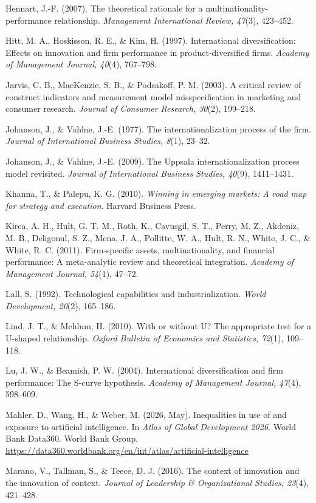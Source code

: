 \documentclass[12pt,a4paper]{article}
\begin{document}
Hennart, J.-F. (2007). The theoretical rationale for a
multinationality-performance relationship. \emph{Management
International Review, 47}(3), 423--452.

Hitt, M. A., Hoskisson, R. E., \& Kim, H. (1997). International
diversification: Effects on innovation and firm performance in
product-diversified firms. \emph{Academy of Management Journal, 40}(4),
767--798.

Jarvis, C. B., MacKenzie, S. B., \& Podsakoff, P. M. (2003). A critical
review of construct indicators and measurement model misspecification in
marketing and consumer research. \emph{Journal of Consumer Research,
30}(2), 199--218.

Johanson, J., \& Vahlne, J.-E. (1977). The internationalization process
of the firm. \emph{Journal of International Business Studies, 8}(1),
23--32.

Johanson, J., \& Vahlne, J.-E. (2009). The Uppsala internationalization
process model revisited. \emph{Journal of International Business
Studies, 40}(9), 1411--1431.

Khanna, T., \& Palepu, K. G. (2010). \emph{Winning in emerging markets:
A road map for strategy and execution}. Harvard Business Press.

Kirca, A. H., Hult, G. T. M., Roth, K., Cavusgil, S. T., Perry, M. Z.,
Akdeniz, M. B., Deligonul, S. Z., Mena, J. A., Pollitte, W. A., Hult, R.
N., White, J. C., \& White, R. C. (2011). Firm-specific assets,
multinationality, and financial performance: A meta-analytic review and
theoretical integration. \emph{Academy of Management Journal, 54}(1),
47--72.

Lall, S. (1992). Technological capabilities and industrialization.
\emph{World Development, 20}(2), 165--186.

Lind, J. T., \& Mehlum, H. (2010). With or without U? The appropriate
test for a U-shaped relationship. \emph{Oxford Bulletin of Economics and
Statistics, 72}(1), 109--118.

Lu, J. W., \& Beamish, P. W. (2004). International diversification and
firm performance: The S-curve hypothesis. \emph{Academy of Management
Journal, 47}(4), 598--609.

Mahler, D., Wang, H., \& Weber, M. (2026, May). Inequalities in use of
and exposure to artificial intelligence. In \emph{Atlas of Global
Development 2026}. World Bank Data360. World Bank Group.
\url{https://data360.worldbank.org/en/int/atlas/artificial-intelligence}

Marano, V., Tallman, S., \& Teece, D. J. (2016). The context of
innovation and the innovation of context. \emph{Journal of Leadership \&
Organizational Studies, 23}(4), 421--428.
\end{document}
